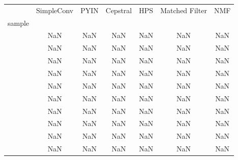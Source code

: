 \begin{tabular}{lcccccc}
\toprule
 & SimpleConv & PYIN & Cepstral & HPS & Matched Filter & NMF \\
sample &  &  &  &  &  &  \\
\midrule
 & NaN & NaN & NaN & NaN & NaN & NaN \\
 & NaN & NaN & NaN & NaN & NaN & NaN \\
 & NaN & NaN & NaN & NaN & NaN & NaN \\
 & NaN & NaN & NaN & NaN & NaN & NaN \\
 & NaN & NaN & NaN & NaN & NaN & NaN \\
 & NaN & NaN & NaN & NaN & NaN & NaN \\
 & NaN & NaN & NaN & NaN & NaN & NaN \\
 & NaN & NaN & NaN & NaN & NaN & NaN \\
 & NaN & NaN & NaN & NaN & NaN & NaN \\
 & NaN & NaN & NaN & NaN & NaN & NaN \\
\bottomrule
\end{tabular}
